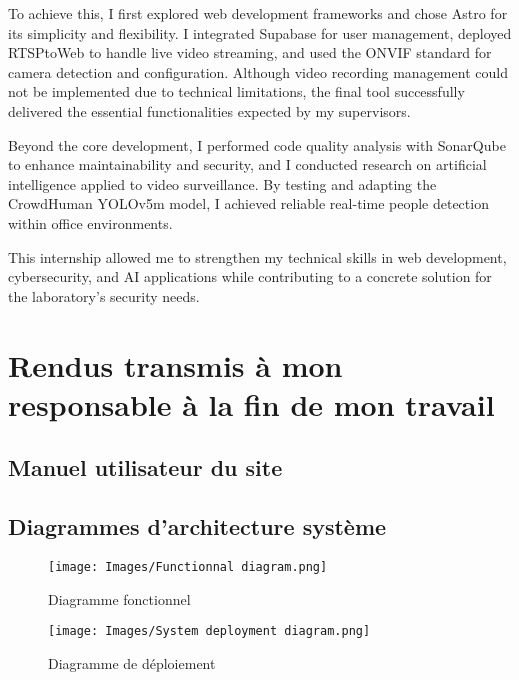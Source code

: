 \begin{appendices}
To achieve this, I first explored web development frameworks and chose Astro for its simplicity and flexibility. I integrated Supabase for user management, deployed RTSPtoWeb to handle live video streaming, and used the ONVIF standard for camera detection and configuration. Although video recording management could not be implemented due to technical limitations, the final tool successfully delivered the essential functionalities expected by my supervisors.

Beyond the core development, I performed code quality analysis with SonarQube to enhance maintainability and security, and I conducted research on artificial intelligence applied to video surveillance. By testing and adapting the CrowdHuman YOLOv5m model, I achieved reliable real-time people detection within office environments.

This internship allowed me to strengthen my technical skills in web development, cybersecurity, and AI applications while contributing to a concrete solution for the laboratory’s security needs.


\chapter{Rendus transmis à mon responsable à la fin de mon travail}

\section{Manuel utilisateur du site}




\section{Diagrammes d'architecture système}

\begin{figure}[H]
    \centering
    \texttt{[image: Images/Functionnal diagram.png]}
    \caption{Diagramme fonctionnel}
    \label{fig:functdiag}
\end{figure}

\begin{figure}[H]
    \centering
    \texttt{[image: Images/System deployment diagram.png]}
    \caption{Diagramme de déploiement}
    \label{fig:systdepldiag}
\end{figure}



\end{appendices}
